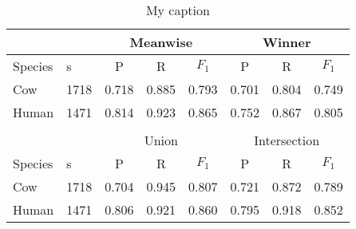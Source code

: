 \begin{table}[t]
\centering
\caption{My caption}
\label{my-label}
\begin{tabular}{llllllll}
\cline{3-8}
 & \multicolumn{1}{l|}{} & \multicolumn{3}{c|}{Meanwise} & \multicolumn{3}{c|}{Winner} \\ \hline
\multicolumn{1}{|l|}{Species} & \multicolumn{1}{l|}{\isol{}s} & \multicolumn{1}{c}{P} & \multicolumn{1}{c}{R} & \multicolumn{1}{c|}{$F_1$} & \multicolumn{1}{c}{P} & \multicolumn{1}{c}{R} & \multicolumn{1}{c|}{$F_1$} \\ \hline
\multicolumn{1}{|l|}{Cow} & \multicolumn{1}{l|}{1718} & 0.718 & 0.885 & \multicolumn{1}{l|}{0.793} & 0.701 & 0.804 & \multicolumn{1}{l|}{0.749} \\
\multicolumn{1}{|l|}{Human} & \multicolumn{1}{l|}{1471} & 0.814 & 0.923 & \multicolumn{1}{l|}{0.865} & 0.752 & 0.867 & \multicolumn{1}{l|}{0.805} \\ \hline
 &  &  &  &  &  &  &  \\ \cline{3-8} 
 & \multicolumn{1}{l|}{} & \multicolumn{3}{c|}{Union} & \multicolumn{3}{c|}{Intersection} \\ \hline
\multicolumn{1}{|l|}{Species} & \multicolumn{1}{l|}{\isol{}s} & \multicolumn{1}{c}{P} & \multicolumn{1}{c}{R} & \multicolumn{1}{c|}{$F_1$} & \multicolumn{1}{c}{P} & \multicolumn{1}{c}{R} & \multicolumn{1}{c|}{$F_1$} \\ \hline
\multicolumn{1}{|l|}{Cow} & \multicolumn{1}{l|}{1718} & 0.704 & 0.945 & \multicolumn{1}{l|}{0.807} & 0.721 & 0.872 & \multicolumn{1}{l|}{0.789} \\
\multicolumn{1}{|l|}{Human} & \multicolumn{1}{l|}{1471} & 0.806 & 0.921 & \multicolumn{1}{l|}{0.860} & 0.795 & 0.918 & \multicolumn{1}{l|}{0.852} \\ \hline
\end{tabular}
\end{table}